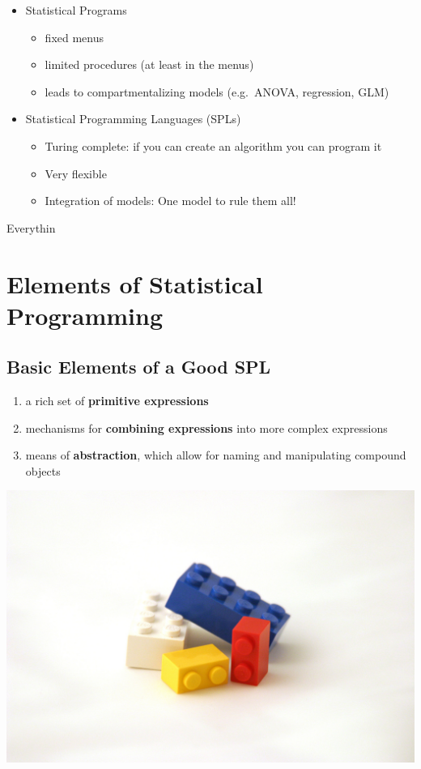 \documentclass[
]{book}
\providecommand{\tightlist}{%
  \setlength{\itemsep}{0pt}\setlength{\parskip}{0pt}}
\begin{document}
\begin{itemize}
\tightlist
\item
  Statistical Programs

  \begin{itemize}
  \tightlist
  \item
    fixed menus
  \item
    limited procedures (at least in the menus)
  \item
    leads to compartmentalizing models (e.g.~ANOVA, regression, GLM)
  \end{itemize}
\item
  Statistical Programming Languages (SPLs)

  \begin{itemize}
  \tightlist
  \item
    Turing complete: if you can create an algorithm you can program it
  \item
    Very flexible
  \item
    Integration of models: One model to rule them all!
  \end{itemize}
\end{itemize}

Everythin

\hypertarget{elements-of-statistical-programming}{%
\section{Elements of Statistical Programming}\label{elements-of-statistical-programming}}

\hypertarget{basic-elements-of-a-good-spl}{%
\subsection{Basic Elements of a Good SPL}\label{basic-elements-of-a-good-spl}}

\begin{enumerate}
\def\labelenumi{\arabic{enumi}.}
\tightlist
\item
  a rich set of \textbf{primitive expressions}
\item
  mechanisms for \textbf{combining expressions} into more complex expressions
\item
  means of \textbf{abstraction}, which allow for naming and manipulating compound objects
\end{enumerate}

\includegraphics[width=0.4\linewidth]{figures/blocks}
\end{document}
